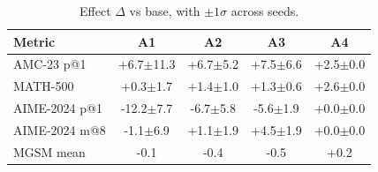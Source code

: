 \begin{table}[t]
\centering\small
\caption{Effect $\Delta$ vs base, with $\pm 1\sigma$ across seeds.}
\label{tab:delta_v2}
\begin{tabular}{lcccc}
\toprule
Metric & A1 & A2 & A3 & A4 \\
\midrule
AMC-23 p@1 & +6.7$\pm$11.3 & +6.7$\pm$5.2 & +7.5$\pm$6.6 & +2.5$\pm$0.0 \\
MATH-500 & +0.3$\pm$1.7 & +1.4$\pm$1.0 & +1.3$\pm$0.6 & +2.6$\pm$0.0 \\
AIME-2024 p@1 & -12.2$\pm$7.7 & -6.7$\pm$5.8 & -5.6$\pm$1.9 & +0.0$\pm$0.0 \\
AIME-2024 m@8 & -1.1$\pm$6.9 & +1.1$\pm$1.9 & +4.5$\pm$1.9 & +0.0$\pm$0.0 \\
MGSM mean & -0.1 & -0.4 & -0.5 & +0.2 \\
\bottomrule
\end{tabular}
\end{table}